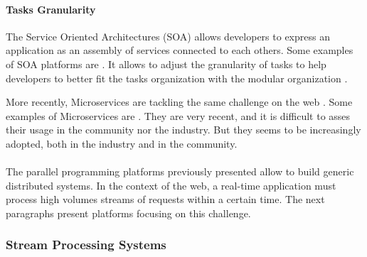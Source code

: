 
\paragraph{Tasks Granularity}

The Service Oriented Architectures (SOA) allows developers to express an application as an assembly of services connected to each others.
Some examples of SOA platforms are .
It allows to adjust the granularity of tasks to help developers to better fit the tasks organization with the modular organization \cite{Adam2008}.

More recently, Microservices are tackling the same challenge on the web \cite{Fernandez-Villamor2010,Fowler2014,Namiot2014}.
Some examples of Microservices are .
They are very recent, and it is difficult to asses their usage in the community nor the industry.
But they seems to be increasingly adopted, both in the industry and in the community.



\paragraph{}

The parallel programming platforms previously presented allow to build generic distributed systems.
In the context of the web, a real-time application must process high volumes streams of requests within a certain time.
The next paragraphs present platforms focusing on this challenge.


\subsubsection{Stream Processing Systems}

